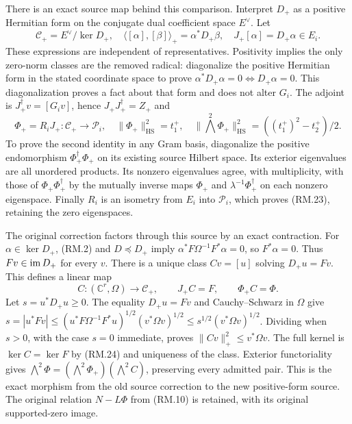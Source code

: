 \documentclass[11pt]{article}
\newcommand{\HS}{\mathrm{HS}}\newcommand{\rk}{\operatorname{rank}}
\begin{document}
There is an exact source map behind this comparison. Interpret $D_+$ as
a positive Hermitian form on the conjugate dual coefficient space $E^\vee$.
Let
\begin{equation}
 \mathcal C_+=E^\vee/\ker D_+,\quad
 \langle[\alpha],[\beta]\rangle_+=\alpha^*D_+\beta,\quad
 J_+[\alpha]=D_+\alpha\in E_i.\tag{RM.22}
\end{equation}
These expressions are independent of representatives. Positivity implies
the only zero-norm classes are the removed radical: diagonalize the positive
Hermitian form in the stated coordinate space to prove
$\alpha^*D_+\alpha=0\Longleftrightarrow D_+\alpha=0$.
This diagonalization proves a fact about that form and does not alter $G_i$.
The adjoint is $J_+^\dagger v=[G_iv]$, hence
$J_+J_+^\dagger=Z_+$ and
\begin{equation}
 \Phi_+=R_iJ_+:\mathcal C_+\to\mathcal P_i,\quad
 \|\Phi_+\|_\HS^2=t_1^+,\quad
 \|\bigwedge^2\Phi_+\|_\HS^2=((t_1^+)^2-t_2^+)/2.\tag{RM.23}
\end{equation}
To prove the second identity in any Gram basis, diagonalize the positive
endomorphism $\Phi_+^\dagger\Phi_+$ on its existing source Hilbert space.
Its exterior eigenvalues are all unordered products. Its nonzero eigenvalues
agree, with multiplicity, with those of $\Phi_+\Phi_+^\dagger$ by the
mutually inverse maps $\Phi_+$ and $\lambda^{-1}\Phi_+^\dagger$ on each
nonzero eigenspace. Finally $R_i$ is an isometry from $E_i$ into
$\mathcal P_i$, which proves (RM.23), retaining the zero eigenspaces.

The original correction factors through this source by an exact contraction.
For $\alpha\in\ker D_+$, (RM.2) and $D\preceq D_+$ imply
$\alpha^*F\Omega^{-1}F^*\alpha=0$, so $F^*\alpha=0$.
Thus $Fv\in\operatorname{im} D_+$ for every $v$. There is a unique class $C v=[u]$
solving $D_+u=Fv$. This defines a linear map
\begin{equation}
 C:(\mathbb C^r,\Omega)\to\mathcal C_+,\qquad
 J_+C=F,\qquad \Phi_+C=\Phi.\tag{RM.24}
\end{equation}
Let $s=u^*D_+u\ge0$. The equality $D_+u=Fv$ and Cauchy--Schwarz in
$\Omega$ give
$s=|u^*Fv|\le (u^*F\Omega^{-1}F^*u)^{1/2}(v^*\Omega v)^{1/2}
\le s^{1/2}(v^*\Omega v)^{1/2}$. Dividing when $s>0$, with the case
$s=0$ immediate, proves $\|Cv\|_+^2\le v^*\Omega v$.
The full kernel is $\ker C=\ker F$ by (RM.24) and uniqueness of the
class. Exterior functoriality gives
$\bigwedge^2\Phi=(\bigwedge^2\Phi_+)(\bigwedge^2 C)$, preserving
every admitted pair. This is the exact morphism from the old source
correction to the new positive-form source. The original relation
$N-L\Phi$ from (RM.10) is retained, with its original supported-zero image.
\end{document}
